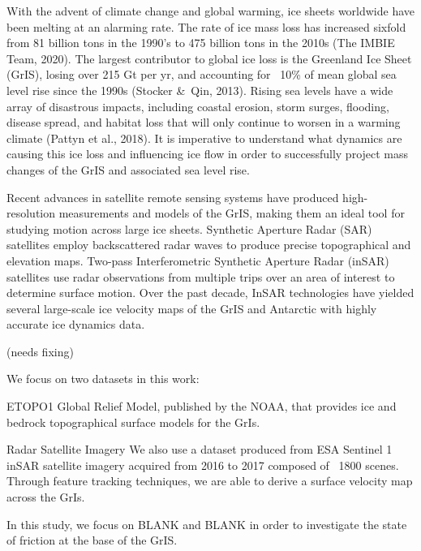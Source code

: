 \documentclass{article}
\begin{document}
With the advent of climate change and global warming, ice sheets worldwide have been melting at an alarming rate. The rate of ice mass loss has increased sixfold from 81 billion tons in the 1990’s to 475 billion tons in the 2010s (The IMBIE Team, 2020). The largest contributor to global ice loss is the Greenland Ice Sheet (GrIS), losing over 215 Gt per yr, and accounting for ~10\% of mean global sea level rise since the 1990s (Stocker \&\ Qin, 2013). Rising sea levels have a wide array of disastrous impacts, including coastal erosion, storm surges, flooding, disease spread, and habitat loss that will only continue to worsen in a warming climate (Pattyn et al., 2018). It is imperative to understand what dynamics are causing this ice loss and influencing ice flow in order to successfully project mass changes of the GrIS and associated sea level rise.

Recent advances in satellite remote sensing systems have produced high-resolution measurements and models of the GrIS, making them an ideal tool for studying motion across large ice sheets. Synthetic Aperture Radar (SAR) satellites employ backscattered radar waves to produce precise topographical and elevation maps. Two-pass Interferometric Synthetic Aperture Radar (inSAR) satellites use radar observations from multiple trips over an area of interest to determine surface motion. Over the past decade, InSAR technologies have yielded several large-scale ice velocity maps of the GrIS and Antarctic with highly accurate ice dynamics data. 

(needs fixing)

We focus on two datasets in this work: 

\begin{enumerate} 

ETOPO1 Global Relief Model, published by the NOAA, that provides ice and bedrock topographical surface models for the GrIs.

Radar Satellite Imagery We also use a dataset produced from ESA Sentinel 1 inSAR satellite imagery acquired from 2016 to 2017 composed of ~1800 scenes. Through feature tracking techniques, we are able to derive a surface velocity map across the GrIs. 


\end{enumerate}





In this study, we focus on BLANK and BLANK in order to investigate the state of friction at the base of the GrIS. 
\end{document}
